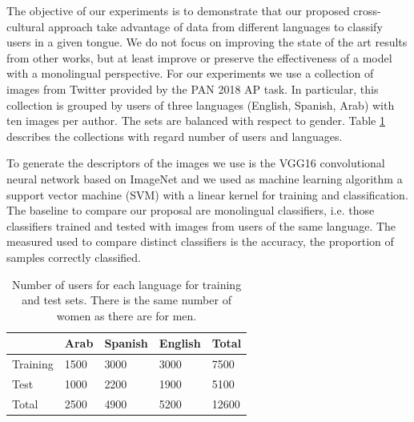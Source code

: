 \documentclass[runningheads]{llncs}
\begin{document}
The objective of our experiments is to demonstrate that our
proposed cross-cultural approach take advantage of data from
different languages to classify users in a given tongue.
We do not focus on improving the state of the art results from
other works, but at least improve or preserve the effectiveness of a model with a 
monolingual perspective. For our experiments
we use a collection of images from Twitter provided by the PAN 2018 AP task.
In particular, this collection is grouped by users of three languages (English, 
Spanish, Arab) with ten images per author. The sets are balanced with respect
to gender. Table \ref{table-datasets} describes the collections with regard
number of users and languages.

To generate the descriptors of the images we use is the VGG16 convolutional
neural network based on ImageNet and we used as machine learning algorithm a support vector 
machine (SVM) with a linear kernel for training and classification. The 
baseline to compare our proposal are monolingual classifiers, i.e. 
those classifiers trained and tested with images from users of the same language.
The measured used to compare distinct classifiers is the accuracy, the proportion
of samples correctly classified.


\begin{table}[]
\centering
\caption{Number of users for each language for training and test sets. There is the same number of women as there are for men.}
\label{table-datasets}
\begin{tabular}{@{}lllll@{}}
\toprule
         & Arab & Spanish & English & Total \\ \midrule
Training & 1500 & 3000    & 3000    & 7500  \\ \midrule
Test     & 1000 & 2200    & 1900    & 5100  \\\midrule
Total    & 2500 & 4900    & 5200    & 12600 \\ \bottomrule
\end{tabular}
\end{table}
\end{document}
